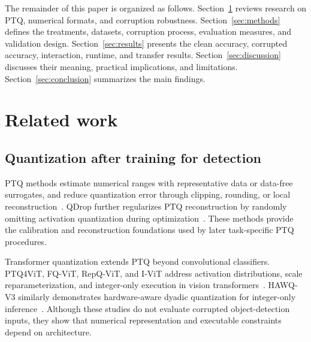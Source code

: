 \documentclass[a4paper,fleqn]{cas-dc}
\begin{document}
The remainder of this paper is organized as follows. Section~\ref{sec:related-work} reviews research on PTQ, numerical formats, and corruption robustness. Section~\ref{sec:methods} defines the treatments, datasets, corruption process, evaluation measures, and validation design. Section~\ref{sec:results} presents the clean accuracy, corrupted accuracy, interaction, runtime, and transfer results. Section~\ref{sec:discussion} discusses their meaning, practical implications, and limitations. Section~\ref{sec:conclusion} summarizes the main findings.

\section{Related work}
\label{sec:related-work}

\subsection{Quantization after training for detection}

PTQ methods estimate numerical ranges with representative data or data-free surrogates, and reduce quantization error through clipping, rounding, or local reconstruction~\citep{krishnamoorthi2018whitepaper,nagel2019dfq,cai2020zeroq,nagel2020adaround,hubara2021smallcalibration,li2021brecq}. QDrop further regularizes PTQ reconstruction by randomly omitting activation quantization during optimization~\citep{wei2022qdrop}. These methods provide the calibration and reconstruction foundations used by later task-specific PTQ procedures.

Transformer quantization extends PTQ beyond convolutional classifiers. PTQ4ViT, FQ-ViT, RepQ-ViT, and I-ViT address activation distributions, scale reparameterization, and integer-only execution in vision transformers~\citep{yuan2022ptq4vit,lin2022fqvit,li2023repqvit,li2023ivit}. HAWQ-V3 similarly demonstrates hardware-aware dyadic quantization for integer-only inference~\citep{yao2021hawqv3}. Although these studies do not evaluate corrupted object-detection inputs, they show that numerical representation and executable constraints depend on architecture.
\end{document}
